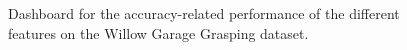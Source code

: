 \begin{figure}[thpb]
   \hfill
  \caption{Dashboard for the accuracy-related performance of the different features on the Willow Garage Grasping dataset.}
  \label{fig:WGDB_dashboard}
\end{figure}
